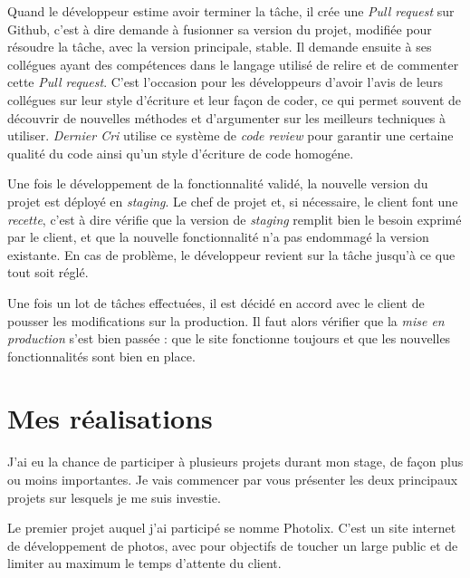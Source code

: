 \bigskip

Quand le développeur estime avoir terminer la tâche, il crée une
\emph{Pull request} sur Github, c'est à dire demande à fusionner sa
version du projet, modifiée pour résoudre la tâche, avec la version
principale, stable. Il demande ensuite à ses collégues ayant des
compétences dans le langage utilisé de relire et de commenter cette
\emph{Pull request}. C'est l'occasion pour les développeurs d'avoir
l'avis de leurs collégues sur leur style d'écriture et leur façon de
coder, ce qui permet souvent de découvrir de nouvelles méthodes et
d'argumenter sur les meilleurs techniques à utiliser. \emph{Dernier Cri}
utilise ce système de \emph{code review} pour garantir une certaine
qualité du code ainsi qu'un style d'écriture de code homogéne.

\bigskip

Une fois le développement de la fonctionnalité validé, la nouvelle
version du projet est déployé en \emph{staging}. Le chef de projet et,
si nécessaire, le client font une \emph{recette}, c'est à dire vérifie
que la version de \emph{staging} remplit bien le besoin exprimé par le
client, et que la nouvelle fonctionnalité n'a pas endommagé la version
existante. En cas de problème, le développeur revient sur la tâche
jusqu'à ce que tout soit réglé.

\bigskip

Une fois un lot de tâches effectuées, il est décidé en accord avec le
client de pousser les modifications sur la production. Il faut alors
vérifier que la \emph{mise en production} s'est bien passée : que le
site fonctionne toujours et que les nouvelles fonctionnalités sont bien
en place.

\newpage

\section{Mes réalisations}\label{mes-ruxe9alisations}

\bigskip

J'ai eu la chance de participer à plusieurs projets durant mon stage, de
façon plus ou moins importantes. Je vais commencer par vous présenter
les deux principaux projets sur lesquels je me suis investie.

\bigskip

Le premier projet auquel j'ai participé se nomme Photolix. C'est un site
internet de développement de photos, avec pour objectifs de toucher un
large public et de limiter au maximum le temps d'attente du client.

